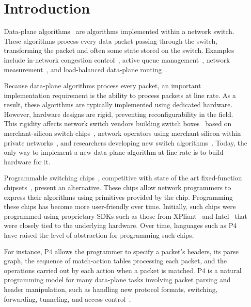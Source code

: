 \section{Introduction}
\label{s:intro}

Data-plane algorithms~\cite{cestan} are algorithms implemented within a network
switch. These algorithms process every data packet passing through the switch,
transforming the packet and often some state stored on the switch.  Examples
include in-network congestion control~\cite{xcp, rcp, pdq, dctcp}, active queue
management~\cite{codel}, network measurement~\cite{opensketch, bitmap_george,
elephant_george}, and load-balanced data-plane routing~\cite{conga}.

Because data-plane algorithms process every packet, an important implementation
requirement is the ability to process packets at line rate.  As a result, these
algorithms are typically implemented using dedicated hardware. However,
hardware designs are rigid, preventing reconfigurability in the field. This
rigidity affects network switch vendors building switch
boxes~\cite{cisco_nexus, dell_force10, arista_7050} based on merchant-silicon
switch chips~\cite{trident, tomahawk, mellanox}, network operators using
merchant silicon within private networks~\cite{google,facebook,vl2}, and
researchers developing new switch algorithms~\cite{xcp, codel, d3, detail,
pdq}. Today, the only way to implement a new data-plane algorithm at line rate
is to build hardware for it.

Programmable switching chips~\cite{flexpipe, xpliant, rmt}, competitive with
state of the art fixed-function chipsets~\cite{trident, tomahawk, mellanox},
present an alternative.  These chips allow network programmers to express their
algorithms using primitives provided by the chip.  Programming these chips has
become more user-friendly over time. Initially, such chips were programmed
using proprietary SDKs such as those from XPliant~\cite{xpliant_sdk,
xpliant_sdk2} and Intel~\cite{intel_sdk} that were closely tied to the
underlying hardware.  Over time, languages such as P4~\cite{p4, p4spec} have
raised the level of abstraction for programming such chips.

For instance, P4 allows the programmer to specify a packet's headers, its
parse graph, the sequence of match-action tables processing each
packet, and the operations carried out by each action when a packet is
matched. P4 is a natural programming model for many data-plane tasks
involving packet parsing and header manipulation, such as handling new protocol
formats, switching, forwarding, tunneling, and access control~\cite{dc_p4}.

